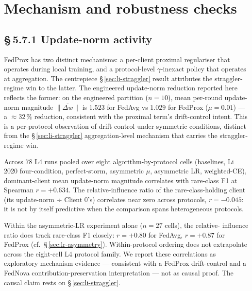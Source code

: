 
\section{Mechanism and robustness checks}
\label{sec:mechanism-robustness}


\subsection*{\S\,5.7.1 Update-norm activity}

FedProx has two distinct mechanisms: a per-client proximal regulariser
that operates during local training, and a protocol-level $\gamma$-inexact
policy that operates at aggregation. The centrepiece
\S\,\ref{sec:li-straggler} result attributes the straggler-regime win to
the latter. The engineered update-norm reduction reported here reflects
the former: on the engineered partition ($n=10$), mean per-round
update-norm magnitude $\overline{\lVert \Delta w \rVert}$ is $1.523$ for
FedAvg vs $1.029$ for FedProx ($\mu = 0.01$) --- a $\approx 32\,\%$
reduction, consistent with the proximal term's drift-control intent. This
is a per-protocol observation of drift control under symmetric conditions,
distinct from the \S\,\ref{sec:li-straggler} aggregation-level mechanism
that carries the straggler-regime win.

Across 78 L4 runs pooled over eight algorithm-by-protocol cells (baselines,
Li 2020 four-condition, perfect-storm, asymmetric $\mu$, asymmetric LR,
weighted-CE), dominant-client mean update-norm magnitude correlates with
rare-class F1 at Spearman $r = +0.634$. The relative-influence ratio of the
rare-class-holding client (its update-norm $\div$ Client 0's) correlates
near zero across protocols, $r = -0.045$: it is not by itself predictive
when the comparison spans heterogeneous protocols.

Within the asymmetric-LR experiment alone ($n=27$ cells), the relative-
influence ratio does track rare-class F1 closely: $r = +0.80$ for FedAvg,
$r = +0.87$ for FedProx (cf.\ \S\,\ref{sec:lr-asymmetry}). Within-protocol
ordering does not extrapolate across the eight-cell L4 protocol family. We
report these correlations as exploratory mechanism evidence --- consistent
with a FedProx drift-control and a FedNova contribution-preservation
interpretation --- not as causal proof. The causal claim rests on
\S\,\ref{sec:li-straggler}.


